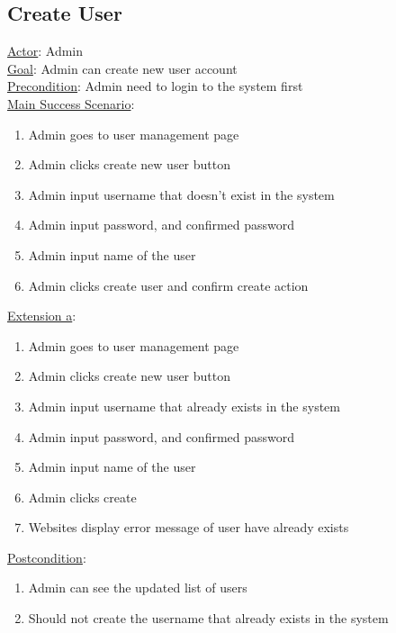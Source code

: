 \documentclass[12pt,oneside,openright,a4paper]{cpe-english-project}
\begin{document}
\subsection{Create User}
\underline{Actor}: Admin\\
\underline{Goal}: Admin can create new user account\\
\underline{Precondition}: Admin need to login to the system first\\
\underline{Main Success Scenario}:
\begin{enumerate}[label={\arabic*.}]
	\item Admin goes to user management page
	\item Admin clicks create new user button
	\item Admin input username that doesn’t exist in the system
	\item Admin input password, and confirmed password
	\item Admin input name of the user
	\item Admin clicks create user and confirm create action
\end{enumerate}
\underline{Extension a}:
\begin{enumerate}[label={\arabic*.}]
	\item Admin goes to user management page
	\item Admin clicks create new user button
	\item Admin input username that already exists in the system
	\item Admin input password, and confirmed password
	\item Admin input name of the user
	\item Admin clicks create
	\item Websites display error message of user have already exists
\end{enumerate}
\underline{Postcondition}: 
\begin{enumerate}[label={\arabic*.}]
	\item Admin can see the updated list of users
	\item Should not create the username that already exists in the system
\end{enumerate}
\end{document}
